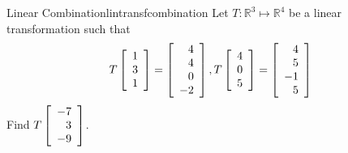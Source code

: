 \begin{example}{Linear Combination}{lintransfcombination}
Let $T:\mathbb{R}^3 \mapsto \mathbb{R}^4$ be a linear transformation such that 
\[
T \left[ \begin{array}{r}
1 \\
3 \\
1
\end{array} \right]
=
\left[ \begin{array}{r}
4 \\
4 \\
0 \\
-2
\end{array} \right],
T \left[ \begin{array}{r}
4 \\
0 \\
5
\end{array} \right]
=
\left[ \begin{array}{r}
4 \\
5 \\
-1 \\
5
\end{array} \right]
\]
Find $T \left[ \begin{array}{r}
-7 \\
3 \\
-9
\end{array} \right]$.
\end{example}

